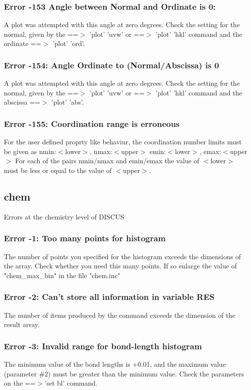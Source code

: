 \subsubsection{Error -153 Angle between Normal and Ordinate is 0: }
A plot was attempted with this angle 
at zero degrees. Check the setting for the 
normal, given by the ==$> $ 'plot' 'uvw' or 
==$> $ 'plot' 'hkl' command and the ordinate 
==$> $ 'plot' 'ord'. 
\subsubsection{Error -154: Angle Ordinate to (Normal/Abscissa) is 0}
\par
A plot was attempted with this angle 
at zero degrees. Check the setting for the 
normal, given by the ==$> $ 'plot' 'uvw' or 
==$> $ 'plot' 'hkl' command and the abscissa 
==$> $ 'plot' 'abs'. 
\subsubsection{Error -155: Coordination range is erroneous}
\par
For the user defined proprty like behaviur, the 
coordination number limits must be given as 
nmin:$ <$lower$> $, nmax:$ <$upper$> $ 
emin:$ <$lower$> $, emax:$ <$upper$> $ 
For each of the pairs nmin/nmax and emin/emax 
the value of $ <$lower$> $ must be less or equal to 
the value of $ <$upper$> $. 
\subsection*{chem}
Errors at the chemistry level of DISCUS 
\par
\subsubsection{Error -1: Too many points for histogram}
\par
The number of points you specified for the histogram exceeds the 
dimensions of the array. 
Check whether you need this many points. If so enlarge the value 
of "chem\_max\_bin" in the file "chem.inc" 
\subsubsection{Error -2: Can't store all information in variable RES}
\par
The number of items produced by the command exceeds the dimension of the 
result array. 
\subsubsection{Error -3: Invalid range for bond-length histogram}
\par
The minimum value of the bond lengths is +0.01, and the maximum 
value (parameter \#2) must be greater than the minimum value. 
Check the parameters on the ==$> $'set bl' command. 
